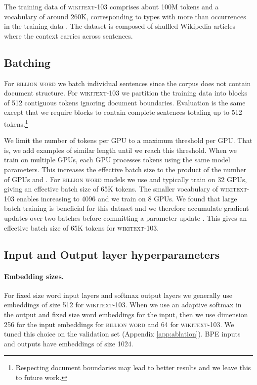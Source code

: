 \documentclass{article} \usepackage{iclr2019_conference,times}
\def\gbw{\textsc{billion word}}
\def\wiki{\textsc{wikitext-103}}
\begin{document}
The training data of \wiki{} comprises about 100M tokens and a vocabulary of around 260K, corresponding to types with more than  occurrences in the training data \citep{wiki103}. 
The dataset is composed of shuffled Wikipedia articles where the context carries across sentences. 


\subsection{Batching}

For \gbw{} we batch individual sentences since the corpus does not contain document structure.
For \wiki{} we partition the training data into blocks of 512 contiguous tokens ignoring document boundaries. 
Evaluation is the same except that we require blocks to contain complete sentences totaling up to 512 tokens.\footnote{
Respecting document boundaries may lead to better results and we leave this to future work.}

We limit the number of tokens per GPU to a maximum threshold  per GPU. 
That is, we add examples of similar length until we reach this threshold.
When we train on multiple GPUs, each GPU processes  tokens using the same model parameters.
This increases the effective batch size to the product of the number of GPUs and . 
For \gbw{} models we use  and typically train on 32 GPUs, giving an effective batch size of 65K tokens. 
The smaller vocabulary of \wiki{} enables increasing  to 4096 and we train on 8 GPUs.
We found that large batch training is beneficial for this dataset and we therefore accumulate gradient updates over two batches before committing a parameter update \citep{ott:uncertainty:2018}.
This gives an effective batch size of 65K tokens for \wiki{}.


\subsection{Input and Output layer hyperparameters}\label{sec:setup}

\paragraph{Embedding sizes.}
For fixed size word input layers and softmax output layers we generally use embeddings of size 512 for \wiki{}.
When we use an adaptive softmax in the output and fixed size word embeddings for the input, then 
we use dimension 256 for the input embeddings for \gbw{} and 64 for \wiki{}. 
We tuned this choice on the validation set (Appendix \ref{app:ablation}).
BPE inputs and outputs have embeddings of size 1024. 
\end{document}
